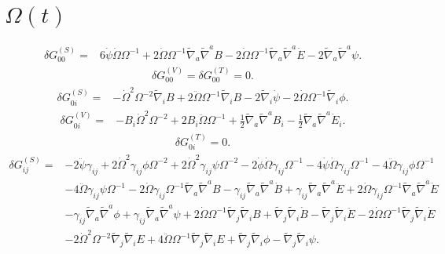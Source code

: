 \documentclass[10pt,letterpaper]{article}
\begin{document}
\section*{ $\Omega(t)$}
\begin{align}
\delta G_{00}^{(S)}={}&6 \dot{\psi} \dot{\Omega} \Omega^{-1}
 + 2 \dot{\Omega} \Omega^{-1} \tilde{\nabla}_{a}\tilde{\nabla}^{a}B
 - 2 \dot{\Omega} \Omega^{-1} \tilde{\nabla}_{a}\tilde{\nabla}^{a}\dot{E}
 - 2 \tilde{\nabla}_{a}\tilde{\nabla}^{a}\psi.
\end{align}
\begin{align}
\delta G_{00}^{(V)}=\delta G_{00}^{(T)}=0.
\end{align}
\begin{align}
\delta G_{0i}^{(S)}={}&- \dot{\Omega}^2 \Omega^{-2} \tilde{\nabla}_{i}B
 + 2 \ddot{\Omega} \Omega^{-1} \tilde{\nabla}_{i}B
 - 2 \tilde{\nabla}_{i}\dot{\psi}
 - 2 \dot{\Omega} \Omega^{-1} \tilde{\nabla}_{i}\phi.
\end{align}
\begin{align}
\delta G_{0i}^{(V)}={}&- B_{i} \dot{\Omega}^2 \Omega^{-2}
 + 2 B_{i} \ddot{\Omega} \Omega^{-1}
 + \tfrac{1}{2} \tilde{\nabla}_{a}\tilde{\nabla}^{a}B_{i}
 -  \tfrac{1}{2} \tilde{\nabla}_{a}\tilde{\nabla}^{a}\dot{E}_{i}.
\end{align}
\begin{align}
\delta G_{0i}^{(T)}=0.
\end{align}
\begin{align}
\delta G_{ij}^{(S)}={}&-2 \ddot{\psi} \gamma_{ij}
 + 2 \dot{\Omega}^2 \gamma_{ij} \phi \Omega^{-2}
 + 2 \dot{\Omega}^2 \gamma_{ij} \psi \Omega^{-2}
 - 2 \dot{\phi} \dot{\Omega} \gamma_{ij} \Omega^{-1}
 - 4 \dot{\psi} \dot{\Omega} \gamma_{ij} \Omega^{-1}
 - 4 \ddot{\Omega} \gamma_{ij} \phi \Omega^{-1}\nonumber\\
& - 4 \ddot{\Omega} \gamma_{ij} \psi \Omega^{-1}
 - 2 \dot{\Omega} \gamma_{ij} \Omega^{-1} \tilde{\nabla}_{a}\tilde{\nabla}^{a}B
 -  \gamma_{ij} \tilde{\nabla}_{a}\tilde{\nabla}^{a}\dot{B}
 + \gamma_{ij} \tilde{\nabla}_{a}\tilde{\nabla}^{a}\ddot{E}
 + 2 \dot{\Omega} \gamma_{ij} \Omega^{-1} \tilde{\nabla}_{a}\tilde{\nabla}^{a}\dot{E}\nonumber\\
& -  \gamma_{ij} \tilde{\nabla}_{a}\tilde{\nabla}^{a}\phi
 + \gamma_{ij} \tilde{\nabla}_{a}\tilde{\nabla}^{a}\psi
 + 2 \dot{\Omega} \Omega^{-1} \tilde{\nabla}_{j}\tilde{\nabla}_{i}B
 + \tilde{\nabla}_{j}\tilde{\nabla}_{i}\dot{B}
 -  \tilde{\nabla}_{j}\tilde{\nabla}_{i}\ddot{E}
 - 2 \dot{\Omega} \Omega^{-1} \tilde{\nabla}_{j}\tilde{\nabla}_{i}\dot{E}\nonumber\\
& - 2 \dot{\Omega}^2 \Omega^{-2} \tilde{\nabla}_{j}\tilde{\nabla}_{i}E
 + 4 \ddot{\Omega} \Omega^{-1} \tilde{\nabla}_{j}\tilde{\nabla}_{i}E
 + \tilde{\nabla}_{j}\tilde{\nabla}_{i}\phi
 -  \tilde{\nabla}_{j}\tilde{\nabla}_{i}\psi.
\end{align}
\end{document}
